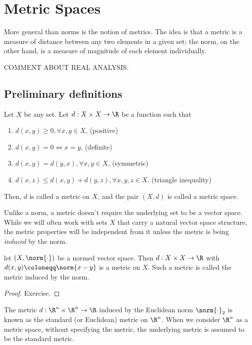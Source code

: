 \section{Metric Spaces}
More general than norms is the notion of metrics. The idea is that a metric is a measure of distance between any two elements in a given set; the norm, on the other hand, is a measure of magnitude of each element individually.

COMMENT ABOUT REAL ANALYSIS.

\subsection{Preliminary definitions}
\begin{ndfn}
  Let $X$ be any set. Let $d : X \times X \to \R$ be a function such that
  \begin{enumerate}
  \item $d(x,y) \geq 0, \forall x,y \in X$, \hfill (positive)
  \item $d(x,y) = 0 \iff x=y$, \hfill (definite)
  \item $d(x,y) = d(y,x), \forall x,y \in X$, \hfill (symmetric)
  \item $d(x,z) \leq d(x,y) + d(y,z), \forall x,y,z \in X$. \hfill (triangle inequality)
  \end{enumerate}
  Then, $d$ is called a metric on $X$, and the pair $(X,d)$ is called a metric space.
\end{ndfn}

Unlike a norm, a metric doesn't require the underlying set to be a vector space. While we will often work with sets $X$ that carry a natural vector space structure, the metric properties will be independent from it unless the metric is being \emph{induced} by the norm.

\begin{nprop}
  let $(X, \norm{\cdot})$ be a normed vector space. Then $d : X \times X \to \R$ with $d(x,y) \coloneqq \norm{x-y}$ is a metric on $X$. Such a metric is called the metric induced by the norm.
\end{nprop}
\begin{proof}
  Exercise.
\end{proof}

The metric $d:\R^n \times \R^n \to \R$ induced by the Euclidean norm $\norm{\cdot}_2$ is known as the standard (or Euclidean) metric on $\R^n$. When we consider $\R^n$ as a metric space, without specifying the metric, the underlying metric is assumed to be the standard metric.

